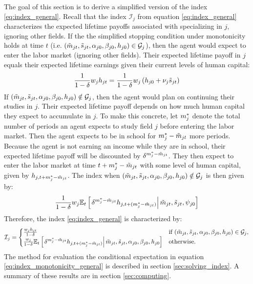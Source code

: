 The goal of this section is to derive a simplified version of the index \eqref{eq:index_general}.
Recall that the index $\mathcal{I}_j$ from equation \eqref{eq:index_general} characterizes the expected lifetime payoffs associated with specializing in $j$, ignoring other fields. 
If the the simplified stopping condition under monotonicity holds at time $t$ (i.e. $\left( \tilde{m}_{jt}, \tilde{s}_{jt}, \alpha_{j0}, \beta_{j0}, h_{j0} \right) \in \mathcal{G}_j$), then the agent would expect to enter the labor market (ignoring other fields).
Their expected lifetime payoff in $j$ equals their expected lifetime earnings given their current levels of human capital:
\begin{equation*}
    \frac{1}{1 - \delta} w_j h_{jt} 
    = 
    \frac{1}{1 - \delta} w_j 
    \left( h_{j0} + \nu_j \tilde{s}_{jt} \right)
\end{equation*}
If $\left( \tilde{m}_{jt}, \tilde{s}_{jt}, \alpha_{j0}, \beta_{j0}, h_{j0} \right) \notin \mathcal{G}_j$, then the agent would plan on continuing their studies in $j$. 
Their expected lifetime payoff depends on how much human capital they expect to accumulate in $j$. 
To make this concrete, let $m_{j}^*$ denote the total number of periods an agent expects to study field $j$ before entering the labor market.
Then the agent expects to be in school for $m_j^* - \tilde{m}_{jt}$ more periods.
Because the agent is not earning an income while they are in school, their expected lifetime payoff will be discounted by $\delta^{m_j^* - \tilde{m}_{jt}}$.
They then expect to enter the labor market at time $t + m_j^* - \tilde{m}_{jt}$ with some level of human capital, given by $h_{j,t + m_j^* - \tilde{m}_{jt}}$.
The index when $(\tilde{m}_{jt}, \tilde{s}_{jt}, \alpha_{j0}, \beta_{j0}, h_{j0}) \notin \mathcal{G}_j$ is then given by:
\begin{equation*}
    \frac{1}{1 - \delta} w_j \mathbb{E}_t \left[\left. 
        \delta^{m_j^* - \tilde{m}_{jt}}
        h_{j,t + (m_j^* - \tilde{m}_{jt})}
     \right\vert \tilde{m}_{jt}, \tilde{s}_{jt}, \psi_{j0} \right] 
\end{equation*}
Therefore, the index \eqref{eq:index_general} is characterized by:
\begin{multline}
    \label{eq:index_monotonicity_general}
    \mathcal{I}_j %
    = 
    \begin{cases}
    \frac{w_j h_{jt}}{1 - \delta}
    &\text{if } (\states) \in \mathcal{G}_j,
    \\
    \frac{w_j}{1 - \delta} \EE_t \ce{
        \delta^{\study_j^* - \tilde{\study}_{jt}}
        h_{j,t + (\study_j^* - \tilde{\study}_{jt})}
    }{\states}
    &\text{otherwise.}
    \end{cases} 
\end{multline}
The method for evaluation the conditional expectation in equation \eqref{eq:index_monotonicity_general} is described in section \ref{sec:solving_index}.
A summary of these results are in section \ref{sec:computing}.




